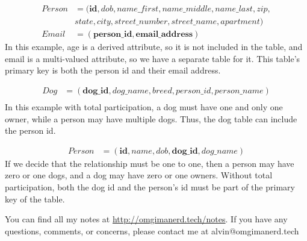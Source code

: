 \documentclass{math}
\begin{document}
\begin{align*}
  Person &= (\textbf{id}, dob, name\_first, name\_middle, name\_last, zip, \\
  & state, city, street\_number, street\_name, apartment) \\
  Email &= (\textbf{person\_id}, \textbf{email\_address})
\end{align*}
In this example, age is a derived attribute, so it is not included in the table,
and email is a multi-valued attribute, so we have a separate table for it. This
table's primary key is both the person id and their email address.
\begin{center}
\end{center}
\begin{align*}
  Dog &= (\textbf{dog\_id}, dog\_name, breed, person\_id, person\_name) \\
\end{align*}
In this example with total participation, a dog must have one and only one
owner, while a person may have multiple dogs. Thus, the dog table can include
the person id.
\begin{center}
\end{center}
\begin{align*}
  Person &= (\textbf{id}, name, dob, \textbf{dog\_id}, dog\_name)
\end{align*}
If we decide that the relationship must be one to one, then a person may have
zero or one dogs, and a dog may have zero or one owners. Without total
participation, both the dog id and the person's id must be part of the primary
key of the table.

\begin{center}
  You can find all my notes at \url{http://omgimanerd.tech/notes}. If you have
  any questions, comments, or concerns, please contact me at
  alvin@omgimanerd.tech
\end{center}
\end{document}
